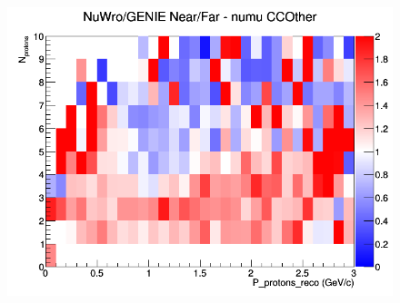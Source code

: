 \documentclass[12pt]{article}
\begin{document}
\begin{figure}[h]
\endminipage
{}
\includegraphics[width=\linewidth]{eff_N_P/FGT/protons/ratios/CCOther_NuWro_GENIE_numu_NF_N_P.png}
\endminipage
\newline
\end{figure}
\clearpage
\end{document}

